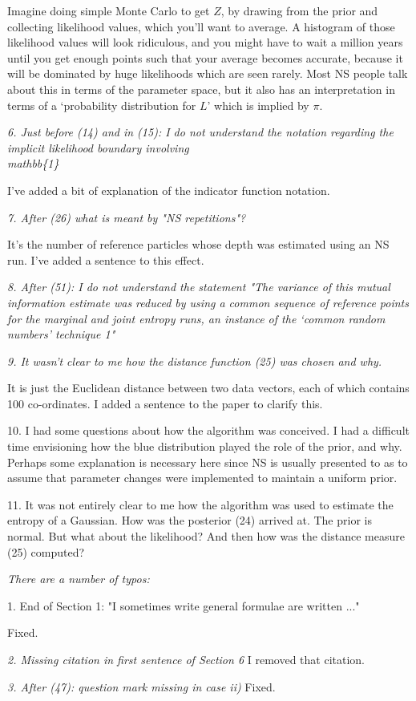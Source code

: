 \documentclass[a4paper, 12pt]{article}
\renewcommand{\quote}{\em}
\begin{document}
Imagine doing simple Monte Carlo to get $Z$, by drawing from the prior and
collecting likelihood values, which you'll want to average. A histogram of
those likelihood values will look ridiculous, and you might have to wait
a million years until you get enough points such that your average becomes
accurate, because it will be dominated by huge likelihoods which are seen
rarely. Most NS people talk about this in terms of the parameter space, but
it also has an interpretation in terms of a `probability distribution for
$L$' which is implied by $\pi$.

{\quote
6. Just before (14) and in (15): I do not understand the notation regarding the implicit likelihood boundary involving \\mathbb\{1\}}

I've added a bit of explanation of the indicator function notation.

{\quote
7. After (26) what is meant by "NS repetitions"?}

It's the number of reference particles
whose depth was estimated using an NS run. I've added a sentence to this effect.

{\quote
8. After (51): I do not understand the statement "The variance of this mutual information estimate was reduced by using a common sequence of reference points for the marginal and joint entropy runs, an instance of the ‘common random numbers’ technique 1"}

{\quote
9. It wasn't clear to me how the distance function (25) was chosen and why.}

It is just the Euclidean distance between two data vectors, each of which
contains 100 co-ordinates. I added a sentence to the paper to clarify this.

10. I had some questions about how the algorithm was conceived.  I had a difficult time envisioning how the blue distribution played the role of the prior, and why.  Perhaps some explanation is necessary here since NS is usually presented to as to assume that parameter changes were implemented to maintain a uniform prior.

11.  It was not entirely clear to me how the algorithm was used to estimate the entropy of a Gaussian.  How was the posterior (24) arrived at.  The prior is normal.  But what about the likelihood?  And then how was the distance measure (25) computed?


{\quote
There are a number of typos:

1. End of Section 1: "I sometimes write general formulae are written ..."}
Fixed.

{\quote
2. Missing citation in first sentence of Section 6}
I removed that citation.

{\quote
3. After (47): question mark missing in case ii)}
Fixed.





\end{document}
